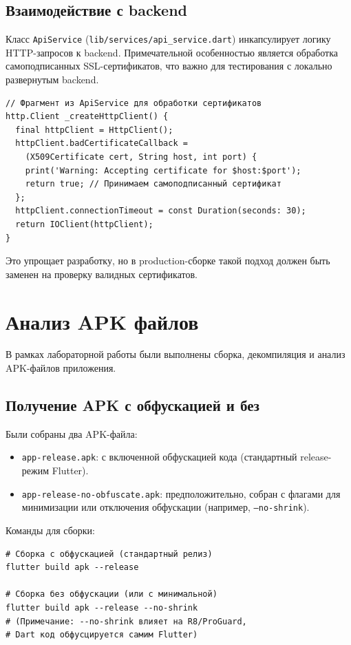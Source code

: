 \subsection{Взаимодействие с backend}
Класс \texttt{ApiService} (\texttt{lib/services/api\_service.dart}) инкапсулирует логику HTTP-запросов к backend. Примечательной особенностью является обработка самоподписанных SSL-сертификатов, что важно для тестирования с локально развернутым backend.
\begin{verbatim}
// Фрагмент из ApiService для обработки сертификатов
http.Client _createHttpClient() {
  final httpClient = HttpClient();
  httpClient.badCertificateCallback = 
    (X509Certificate cert, String host, int port) {
    print('Warning: Accepting certificate for $host:$port');
    return true; // Принимаем самоподписанный сертификат
  };
  httpClient.connectionTimeout = const Duration(seconds: 30);
  return IOClient(httpClient);
}
\end{verbatim}
Это упрощает разработку, но в production-сборке такой подход должен быть заменен на проверку валидных сертификатов.

\section{Анализ APK файлов}
В рамках лабораторной работы были выполнены сборка, декомпиляция и анализ APK-файлов приложения.

\subsection{Получение APK с обфускацией и без}
Были собраны два APK-файла:
\begin{itemize}
    \item \texttt{app-release.apk}: с включенной обфускацией кода (стандартный release-режим Flutter).
    \item \texttt{app-release-no-obfuscate.apk}: предположительно, собран с флагами для минимизации или отключения обфускации (например, \texttt{--no-shrink}).
\end{itemize}
Команды для сборки:
\begin{verbatim}
# Сборка с обфускацией (стандартный релиз)
flutter build apk --release

# Сборка без обфускации (или с минимальной)
flutter build apk --release --no-shrink 
# (Примечание: --no-shrink влияет на R8/ProGuard, 
# Dart код обфусцируется самим Flutter)
\end{verbatim}


